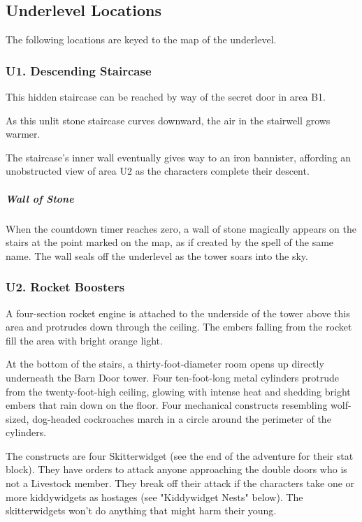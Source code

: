 \documentclass[10pt,a4paper,twoside,bg=print,twocolumn,openany,nodeprecatedcode]{dndbook}
\begin{document}
\subsection{Underlevel Locations}
The following locations are keyed to the map of the underlevel.

\subsubsection{U1. Descending Staircase}
This hidden staircase can be reached by way of the secret door in area B1.

\begin{DndReadAloud}{}
As this unlit stone staircase curves downward, the air in the stairwell grows warmer.

\end{DndReadAloud}

The staircase's inner wall eventually gives way to an iron bannister, affording an unobstructed view of area U2 as the characters complete their descent.

\subparagraph{Wall of Stone}
When the countdown timer reaches zero, a wall of stone magically appears on the stairs at the point marked on the map, as if created by the spell of the same name. The wall seals off the underlevel as the tower soars into the sky.

\subsubsection{U2. Rocket Boosters}
A four-section rocket engine is attached to the underside of the tower above this area and protrudes down through the ceiling. The embers falling from the rocket fill the area with bright orange light.

\begin{DndReadAloud}{}
At the bottom of the stairs, a thirty-foot-diameter room opens up directly underneath the Barn Door tower. Four ten-foot-long metal cylinders protrude from the twenty-foot-high ceiling, glowing with intense heat and shedding bright embers that rain down on the floor. Four mechanical constructs resembling wolf-sized, dog-headed cockroaches march in a circle around the perimeter of the cylinders.

\end{DndReadAloud}

The constructs are four Skitterwidget (see the end of the adventure for their stat block). They have orders to attack anyone approaching the double doors who is not a Livestock member. They break off their attack if the characters take one or more kiddywidgets as hostages (see "Kiddywidget Nests" below). The skitterwidgets won't do anything that might harm their young.
\end{document}
